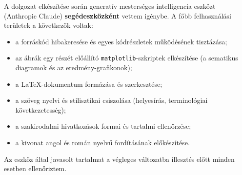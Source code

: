A dolgozat elkészítése során generatív mesterséges intelligencia eszközt
(Anthropic Claude) \textbf{segédeszközként} vettem igénybe. A főbb felhasználási
területek a következők voltak:

\begin{itemize}
  \item a forráskód hibakeresése és egyes kódrészletek működésének tisztázása;
  \item az ábrák egy részét előállító \texttt{matplotlib}-szkriptek elkészítése
  (a sematikus diagramok és az eredmény-grafikonok);
  \item a \LaTeX-dokumentum formázása és szerkesztése;
  \item a szöveg nyelvi és stilisztikai csiszolása (helyesírás, terminológiai
  következetesség);
  \item a szakirodalmi hivatkozások formai és tartalmi ellenőrzése;
  \item a kivonat angol és román nyelvű fordításának előkészítése.
\end{itemize}

Az eszköz által javasolt tartalmat a végleges változatba illesztés előtt minden
esetben ellenőriztem.
